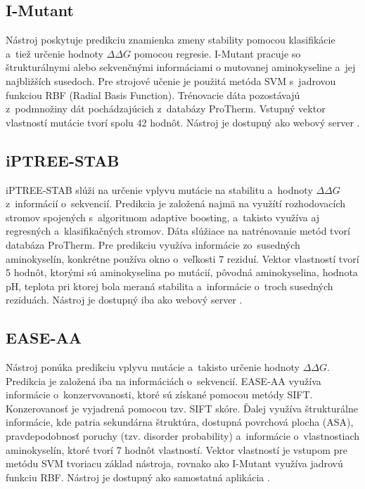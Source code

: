\subsection{I-Mutant}

Nástroj poskytuje predikciu znamienka zmeny stability pomocou klasifikácie a~tiež určenie hodnoty $\Delta\Delta G$ pomocou regresie. I-Mutant pracuje so štrukturálnymi alebo sekvenčnými informáciami o mutovanej aminokyseline a~jej najbližších susedoch. Pre strojové učenie je použitá metóda SVM s~jadrovou funkciou RBF (Radial Basis Function). Trénovacie dáta pozostávajú z~podmnožiny dát pochádzajúcich z~databázy ProTherm. Vstupný vektor vlastností mutácie tvorí spolu 42 hodnôt. Nástroj je dostupný ako webový server \cite{imutant}. 

\subsection{iPTREE-STAB}

iPTREE-STAB slúži na určenie vplyvu mutácie na stabilitu a~hodnoty $\Delta\Delta G$ z~informácií o~sekvencií. Predikcia je založená najmä na využítí rozhodovacích stromov spojených s~algoritmom adaptive boosting, a~takisto využíva aj regresných a~klasifikačných stromov. Dáta slúžiace na natrénovanie metód tvorí databáza ProTherm. Pre predikciu využíva informácie zo~susedných aminokyselín, konkrétne používa okno o~veľkosti 7 reziduí. Vektor vlastností tvorí 5 hodnôt, ktorými sú aminokyselina po mutácií, pôvodná aminokyselina, hodnota pH, teplota pri ktorej bola meraná stabilita a~informácie o~troch susedných reziduách. Nástroj je dostupný iba ako webový server \cite{iptree}.

\subsection{EASE-AA}

Nástroj ponúka predikciu vplyvu mutácie a~takisto určenie hodnoty $\Delta\Delta G$. Predikcia je založená iba na informáciách o~sekvencií. EASE-AA využíva informácie o~konzervovanosti, ktoré sú získané pomocou metódy SIFT. Konzerovanosť je vyjadrená pomocou tzv. SIFT skóre. Ďalej využíva štrukturálne informácie, kde patria sekundárna štruktúra, dostupná povrchová plocha (ASA), pravdepodobnosť poruchy (tzv. disorder probability) a~informácie o~vlastnostiach aminokyselín, ktoré tvorí 7 hodnôt vlastností. Vektor vlastností je vstupom pre metódu SVM tvoriacu základ nástroja, rovnako ako I-Mutant využíva jadrovú funkciu RBF. Nástroj je dostupný ako samostatná aplikácia \cite{ease}.
   
